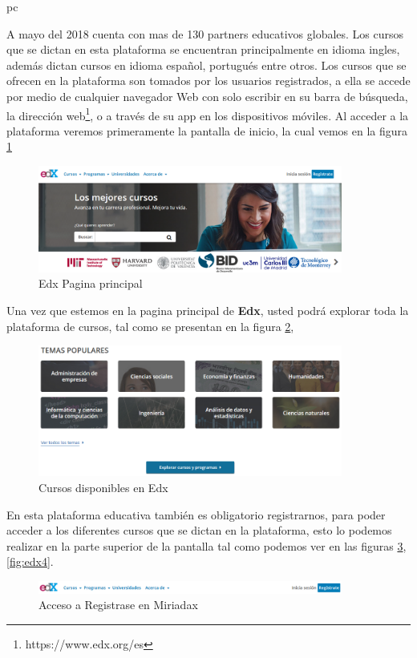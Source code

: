 pc\documentclass[a4paper,12pt,openany]{book}
\begin{document}
A mayo del 2018 cuenta con mas de 130 partners educativos globales. Los cursos que se dictan en esta plataforma se encuentran principalmente en idioma ingles, además dictan cursos en idioma español, portugués entre otros. Los cursos que se ofrecen en la plataforma son tomados por los usuarios registrados, a ella se accede por medio de  cualquier navegador Web con solo escribir en su barra de búsqueda, la dirección web\footnote{https://www.edx.org/es}, o a través de su app en los dispositivos móviles. Al acceder a la plataforma veremos primeramente la pantalla de inicio, la cual vemos en la figura \ref{fig:edx1}

\begin{figure}[ht]
  \centering
	\includegraphics[width=10cm]{edx1.png}
\caption{Edx Pagina principal}
  \label{fig:edx1}
\end{figure}

Una vez que estemos en la pagina principal de \textbf{Edx}, usted podrá explorar toda la plataforma de cursos, tal como se presentan en la figura \ref{fig:edx2}, 

\begin{figure}[ht]
  \centering
	\includegraphics[width=10cm]{edx2.png}
\caption{Cursos disponibles en Edx}
  \label{fig:edx2}
\end{figure}

En esta plataforma educativa también es obligatorio registrarnos, para poder acceder a los diferentes cursos que se dictan en la plataforma, esto lo podemos realizar en la parte superior de la pantalla tal como podemos ver en las figuras \ref{fig:edx3},  \ref{fig:edx4}.

\begin{figure}[H]
  \centering
	\includegraphics[width=10cm]{edx.png}
\caption{Acceso a Registrase en Miriadax}
  \label{fig:edx3}
\end{figure}
\end{document}
